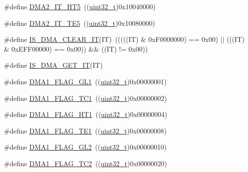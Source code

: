 \begin{DoxyCompactItemize}
\item 
\#define \hyperlink{group___d_m_a__interrupts__definition_ga4c1e0d1572267c1d48d787009148e3ef}{D\+M\+A2\+\_\+\+I\+T\+\_\+\+H\+T5}~((\hyperlink{_p_e___types_8h_a33594304e786b158f3fb30289278f5af}{uint32\+\_\+t})0x10040000)
\item 
\#define \hyperlink{group___d_m_a__interrupts__definition_gad47115e9a4d0d3f5d9101097983b5525}{D\+M\+A2\+\_\+\+I\+T\+\_\+\+T\+E5}~((\hyperlink{_p_e___types_8h_a33594304e786b158f3fb30289278f5af}{uint32\+\_\+t})0x10080000)
\item 
\#define \hyperlink{group___d_m_a__interrupts__definition_ga390481b083355ed774b04f70a42f0dfb}{I\+S\+\_\+\+D\+M\+A\+\_\+\+C\+L\+E\+A\+R\+\_\+\+IT}(IT)~(((((IT) \& 0x\+F0000000) == 0x00) $\vert$$\vert$ (((\+I\+T) \& 0x\+E\+F\+F00000) == 0x00)) \&\& ((\+I\+T) != 0x00))
\item 
\#define \hyperlink{group___d_m_a__interrupts__definition_gaaafa1bd74bc5e78e276c731faa8eed22}{I\+S\+\_\+\+D\+M\+A\+\_\+\+G\+E\+T\+\_\+\+IT}(IT)
\item 
\#define \hyperlink{group___d_m_a__flags__definition_gad1ac00f031065682ac125f6f9be061e6}{D\+M\+A1\+\_\+\+F\+L\+A\+G\+\_\+\+G\+L1}~((\hyperlink{_p_e___types_8h_a33594304e786b158f3fb30289278f5af}{uint32\+\_\+t})0x00000001)
\item 
\#define \hyperlink{group___d_m_a__flags__definition_gaa9b4d1112bcfd34136007b813a11187e}{D\+M\+A1\+\_\+\+F\+L\+A\+G\+\_\+\+T\+C1}~((\hyperlink{_p_e___types_8h_a33594304e786b158f3fb30289278f5af}{uint32\+\_\+t})0x00000002)
\item 
\#define \hyperlink{group___d_m_a__flags__definition_ga9c806b96cfdcebddb64f70d13ad32270}{D\+M\+A1\+\_\+\+F\+L\+A\+G\+\_\+\+H\+T1}~((\hyperlink{_p_e___types_8h_a33594304e786b158f3fb30289278f5af}{uint32\+\_\+t})0x00000004)
\item 
\#define \hyperlink{group___d_m_a__flags__definition_gae30157801ac1460dab86a8f54cfd3479}{D\+M\+A1\+\_\+\+F\+L\+A\+G\+\_\+\+T\+E1}~((\hyperlink{_p_e___types_8h_a33594304e786b158f3fb30289278f5af}{uint32\+\_\+t})0x00000008)
\item 
\#define \hyperlink{group___d_m_a__flags__definition_gad27b8a0cf554638d78fb67a010c0419b}{D\+M\+A1\+\_\+\+F\+L\+A\+G\+\_\+\+G\+L2}~((\hyperlink{_p_e___types_8h_a33594304e786b158f3fb30289278f5af}{uint32\+\_\+t})0x00000010)
\item 
\#define \hyperlink{group___d_m_a__flags__definition_ga0eff24f7e6b2b874328d531ee9315b20}{D\+M\+A1\+\_\+\+F\+L\+A\+G\+\_\+\+T\+C2}~((\hyperlink{_p_e___types_8h_a33594304e786b158f3fb30289278f5af}{uint32\+\_\+t})0x00000020)
$$
\end{DoxyCompactItemize}
